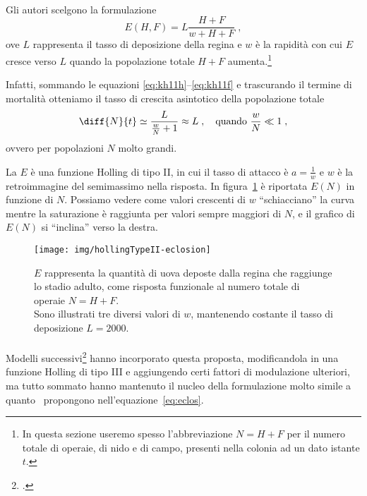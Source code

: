 \paragraph{}
Gli autori scelgono la formulazione
\begin{equation}
    \label{eq:eclos}
    E(H,F) = L \frac{H+F}{w + H + F} \; ,
\end{equation}
ove $L$ rappresenta il tasso di deposizione della regina e $w$ è la rapidità con cui $E$ cresce verso $L$ quando
la popolazione totale $H+F$ aumenta.\footnote{In questa sezione useremo spesso l'abbreviazione
$N=H+F$ per il numero totale di operaie, di nido e di campo, presenti nella colonia ad un dato istante $t$.}

Infatti, sommando le equazioni \eqref{eq:kh11h}--\eqref{eq:kh11f} e trascurando il termine di mortalità otteniamo
il tasso di crescita asintotico della popolazione totale
$$\diff{N}{t} \simeq \frac{L}{ \frac{w}{N} + 1} \approx L \; , \quad \text{quando } \frac{w}{N} \ll 1 \; ,$$
ovvero per popolazioni $N$ molto grandi.

La $E$ è una funzione Holling di tipo II, in cui il tasso di attacco è $a=\frac{1}{w}$ e $w$
è la retroimmagine del semimassimo nella risposta. In figura~\ref{img:eclos} è riportata $E(N)$ in funzione di $N$.
Possiamo vedere come valori
crescenti di $w$ ``schiacciano'' la curva mentre la saturazione è raggiunta per valori sempre maggiori di $N$,
e il grafico di $E(N)$ si ``inclina'' verso la destra.

\begin{figure}[hbp]
    \centering
    \texttt{[image: img/hollingTypeII-eclosion]}

    \caption[Schiusa, Holling tipo II]{$E$ rappresenta la quantità di uova deposte dalla regina che raggiunge lo
    stadio adulto, come risposta funzionale al numero totale di operaie $N=H+F$.
    \\
    Sono illustrati tre diversi valori di $w$, mantenendo costante il tasso di deposizione $L=2000$.}
    \label{img:eclos}
\end{figure}

\paragraph{}
Modelli successivi\footcite{ratti2017} hanno incorporato questa proposta, modificandola in una funzione Holling
di tipo III e aggiungendo certi fattori di modulazione ulteriori, ma tutto sommato hanno mantenuto il nucleo
della formulazione molto simile a quanto~\citeauthor{khoury2011} propongono nell'equazione~\eqref{eq:eclos}.


